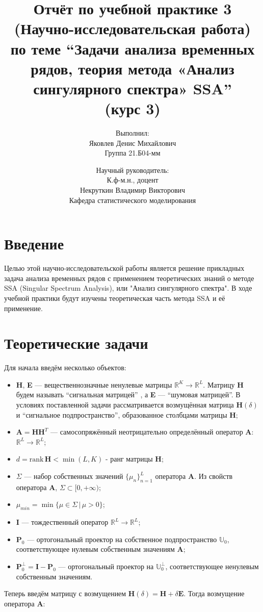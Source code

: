 \documentclass[fleqn]{article}
\title{Отчёт по учебной практике 3 (Научно-исследовательская работа) по теме ``Задачи анализа временных рядов, теория метода «Анализ сингулярного спектра» SSA''\\(курс 3)}
\author{Выполнил:\\ Яковлев Денис Михайлович\\ Группа 21.Б04-мм \and Научный руководитель:\\ К.ф-м.н., доцент\\ Некруткин Владимир Викторович\\ Кафедра статистического моделирования}
\newcommand\R{\mathbb{R}}
\newcommand\rank{\textrm{rank}\,}
\begin{document}
	\maketitle
	\newpage
	\section{Введение}
	Целью этой научно-исследовательской работы является решение прикладных задача анализа временных рядов с применением теоретических знаний о методе SSA (Singular Spectrum Analysis), или "Анализ сингулярного спектра". В ходе учебной практики будут изучены теоретическая часть метода SSA и её применение.
	\section{Теоретические задачи}
		Для начала введём несколько объектов:
	\begin{itemize}
		\item \textbf{H}, \textbf{E} --- вещественнозначные ненулевые матрицы $\R^K \rightarrow \R^L$. Матрицу \textbf{H} будем называть ``сигнальная матрицей'' , а \textbf{E} --- ``шумовая матрицей''. В условиях поставленной задачи рассматривается возмущённая матрица $\textbf{H}(\delta)$ и ``сигнальное подпространство'', образованное столбцами матрицы \textbf{H};
		\item  $\textbf{A} = \textbf{HH}^T$ --- самосопряжённый неотрицательно определённый оператор \textbf{A}: $\R^L \rightarrow \R^L$;
		\item $d = \rank\textbf{H} < \min(L, K)$ - ранг матрицы \textbf{H};
		\item $\Sigma$ --- набор собственных значений $\{\mu_n\}_{n=1}^L$ оператора \textbf{A}. Из свойств оператора \textbf{A}, $\Sigma \subset [0, +\infty)$;
		\item $\mu_{min} = \min\{\mu\in\Sigma\, |\, \mu > 0\}$;
		\item $\textbf{I}$ --- тождественный оператор $\R^L \rightarrow \R^L$;
		\item $\textbf{P}_0$ --- ортогональный проектор на собственное подпространство $\mathbb{U}_0$, соответствующее нулевым собственным значениям \textbf{A};
		\item $\textbf{P}^\bot_0 = \textbf{I} - \textbf{P}_0$ --- ортогональный проектор на $\mathbb{U}_0^\bot$, соответствующее ненулевым собственным значениям. 
	\end{itemize}
	Теперь введём матрицу с возмущением $\textbf{H}(\delta) = \textbf{H} + \delta\textbf{E}$. Тогда возмущение оператора $\textbf{A}$:
\end{document}
